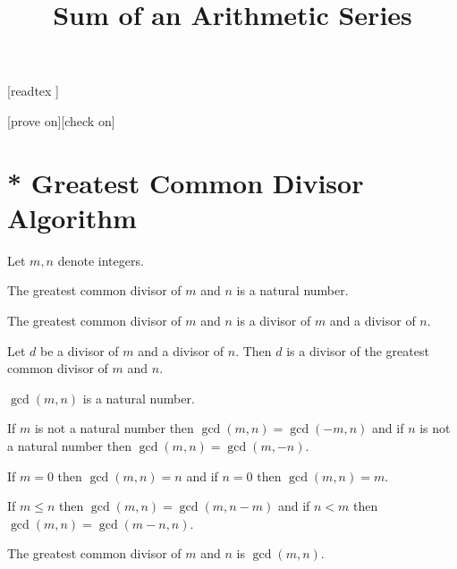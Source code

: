 \documentclass{article}
\title{Sum of an Arithmetic Series}
\author{}
\date{}
\begin{document}
\maketitle

\begin{forthel}

    [readtex ]

    [prove on][check on]
  \end{forthel}



\section{* Greatest Common Divisor Algorithm}

\begin{forthel}
Let $m,n$ denote integers.


\begin{definition}
The greatest common divisor of $m$ and $n$ is a natural number.
\end{definition}

\begin{axiom}
The greatest common divisor of $m$ and $n$ is a divisor of $m$ and a divisor of $n$.
\end{axiom}
\begin{axiom}
Let $d$ be a divisor of $m$ and a divisor of $n$.
Then $d$ is a divisor of the greatest common divisor of $m$ and $n$.
\end{axiom}


\begin{definition}
$\gcd(m,n)$ is a natural number.
\end{definition}

\begin{axiom}
If $m$ is not a natural number then $\gcd(m,n) = \gcd(-m,n)$ and
if $n$ is not a natural number then $\gcd(m,n) = \gcd(m,-n)$.
\end{axiom}
\begin{axiom}
If $m=0$ then $\gcd(m,n)=n$ and if $n=0$ then $\gcd(m,n)=m$.
\end{axiom}
\begin{axiom}
If $m \leq n$ then $\gcd(m,n) = \gcd(m,n-m)$ and if $n < m$ then $\gcd(m,n) = \gcd(m-n,n)$.
\end{axiom}


\begin{proposition}
The greatest common divisor of $m$ and $n$ is $\gcd(m,n)$.
\end{proposition}

\end{forthel}
\end{document}
